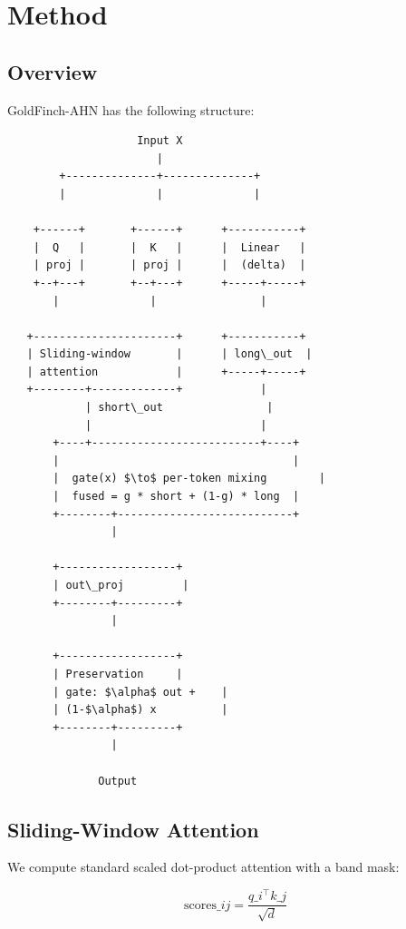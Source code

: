 
\section{Method}

\subsection{Overview}

GoldFinch-AHN has the following structure:

\begin{lstlisting}
                    Input X
                       |
        +--------------+--------------+
        |              |              |
                                       
    +------+       +------+      +-----------+
    |  Q   |       |  K   |      |  Linear   |
    | proj |       | proj |      |  (delta)  |
    +--+---+       +--+---+      +-----+-----+
       |              |                |
                                        
   +----------------------+      +-----------+
   | Sliding-window       |      | long\_out  |
   | attention            |      +-----+-----+
   +--------+-------------+            |
            | short\_out                |
            |                          |
       +----+--------------------------+----+
       |                                    |
       |  gate(x) $\to$ per-token mixing        |
       |  fused = g * short + (1-g) * long  |
       +--------+---------------------------+
                |
                 
       +------------------+
       | out\_proj         |
       +--------+---------+
                |
                 
       +------------------+
       | Preservation     |
       | gate: $\alpha$ out +    |
       | (1-$\alpha$) x          |
       +--------+---------+
                |
                 
              Output
\end{lstlisting}

\subsection{Sliding-Window Attention}

We compute standard scaled dot-product attention with a band mask:

\[
\text{scores}\_{ij} = \frac{q\_i^\top k\_j}{\sqrt{d}}
\tag{4.1}
\]

